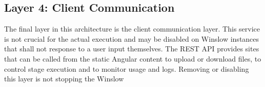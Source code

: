 \subsection{Layer 4: Client Communication}

The final layer in this architecture is the client communication layer.
This service is not crucial for the actual execution and may be disabled on Winslow instances that shall not response to a user input themselves.
The REST API provides sites that can be called from the static Angular content to upload or download files, to control stage execution and to monitor usage and logs.
Removing or disabling this layer is not stopping the Winslow
